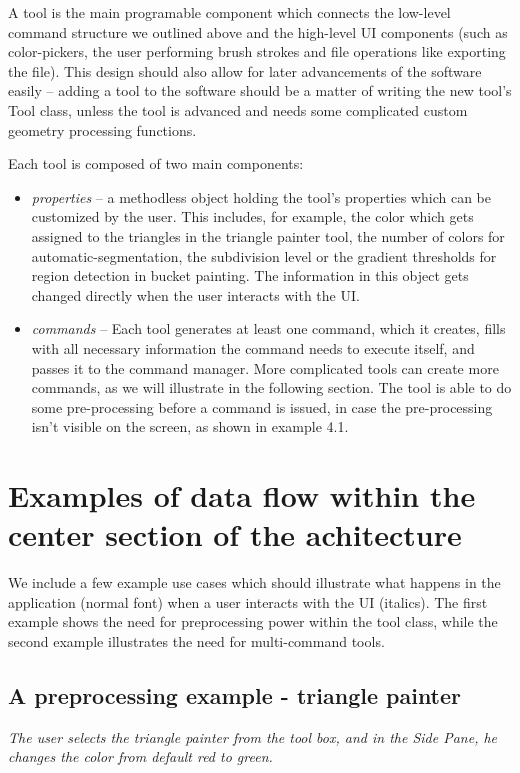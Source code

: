 A tool is the main programable component which connects the low-level command structure we outlined above and the high-level UI components (such as color-pickers, the user performing brush strokes and file operations like exporting the file). This design should also allow for later advancements of the software easily -- adding a tool to the software should be a matter of writing the new tool's Tool class, unless the tool is advanced and needs some complicated custom geometry processing functions.

\medskip

Each tool is composed of two main components:
\begin{itemize}
\item \textit{properties} -- a methodless object holding the tool's properties which can be customized by the user. This includes, for example, the color which gets assigned to the triangles in the triangle painter tool, the number of colors for automatic-segmentation, the subdivision level or the gradient thresholds for region detection in bucket painting. The information in this object gets changed directly when the user interacts with the UI.

\item \textit{commands} -- Each tool generates at least one command, which it creates, fills with all necessary information the command needs to execute itself, and passes it to the command manager. More complicated tools can create more commands, as we will illustrate in the following section. The tool is able to do some pre-processing before a command is issued, in case the pre-processing isn't visible on the screen, as shown in example 4.1.

\end{itemize}

\section{Examples of data flow within the center section of the achitecture}

We include a few example use cases which should illustrate what happens in the application (normal font) when a user interacts with the UI (italics). The first example shows the need for preprocessing power within the tool class, while the second example illustrates the need for multi-command tools.

\subsection{A preprocessing example - triangle painter}
\textit{The user selects the triangle painter from the tool box, and in the Side Pane, he changes the color from default red to green.}

